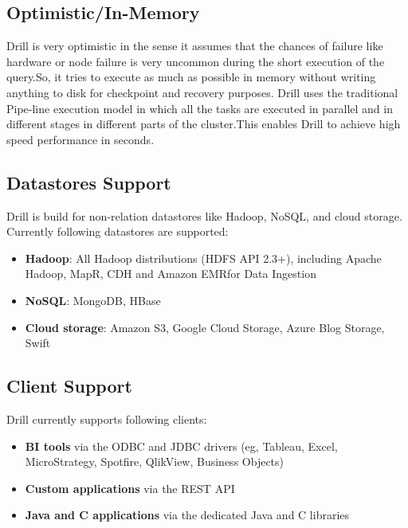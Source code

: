 \documentclass[9pt,twocolumn,twoside]{../../styles/osajnl}
\begin{document}
\subsection*{Optimistic/In-Memory}
	Drill is very optimistic in the sense it assumes that the chances of failure
	like hardware or node failure is very uncommon during the short execution of the
	query.So, it tries to execute as much as possible in memory without writing
	anything to disk for checkpoint and recovery purposes. Drill uses the
	traditional Pipe-line execution model in which all the tasks are executed in
	parallel and in different stages in different parts of the cluster.This enables
	Drill to achieve high speed performance in seconds.

\subsection{Datastores Support}
	Drill is build for non-relation datastores like Hadoop, NoSQL, and cloud
	storage.
	Currently following datastores are supported:
	
	\begin{itemize}
		\item \textbf{Hadoop}: All Hadoop distributions (HDFS API 2.3+), including
		Apache Hadoop, MapR, CDH and Amazon EMRfor Data Ingestion
		\item \textbf{NoSQL}: MongoDB, HBase
		\item \textbf{Cloud storage}: Amazon S3, Google Cloud Storage, Azure Blog
		Storage, Swift
		
	\end{itemize}

\subsection{Client Support}
	Drill currently supports following clients:
	
	\begin{itemize}
		\item \textbf{BI tools} via the ODBC and JDBC drivers (eg, Tableau, Excel,
		MicroStrategy, Spotfire, QlikView, Business Objects)
		\item \textbf{Custom applications} via the REST API
		\item \textbf{Java and C applications} via the dedicated Java and C libraries
		
	\end{itemize}
\end{document}
